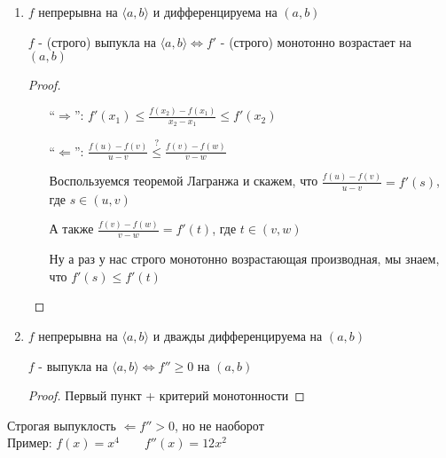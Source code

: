 \begin{enumerate}
    \item $f$ непрерывна на $\langle a, b \rangle$ и дифференцируема на $(a, b)$
    
    $f$ - (строго) выпукла на $\langle a, b \rangle \Longleftrightarrow f'$ - (строго) монотонно возрастает на $(a, b)$
    
    \begin{proof} \quad 

        \begin{enumerate}
            \item[``$\Longrightarrow$'':] $f'(x_1) \leqslant \frac{f(x_2) - f(x_1)}{x_2 - x_1} \leqslant f'(x_2)$
            \item[``$\Longleftarrow$'':] $\frac{f(u) - f(v)}{u - v} \overset{?}{\leqslant} \frac{f(v) - f(w)}{v - w}$
            
            Воспользуемся теоремой Лагранжа и скажем, что $\frac{f(u) - f(v)}{u - v} = f'(s)$, где $s \in (u, v)$ 

            А также $\frac{f(v) - f(w)}{v - w} = f'(t)$, где $t \in (v, w)$ 

            Ну а раз у нас строго монотонно возрастающая производная, мы знаем, что $f'(s) \leqslant f'(t)$
        \end{enumerate}
    \end{proof}

    \item $f$ непрерывна на $\langle a, b \rangle$ и дважды дифференцируема на $(a, b)$
    
    $f$ - выпукла на $\langle a, b \rangle \Longleftrightarrow f'' \geqslant 0$ на $(a, b)$
    
    \begin{proof}
        Первый пункт + критерий монотонности 
    \end{proof}
\end{enumerate}

\notice \; Строгая выпуклость $\Longleftarrow f'' > 0$, но не наоборот \\
Пример: $f(x) = x^4 \qquad f''(x) = 12x^2$

